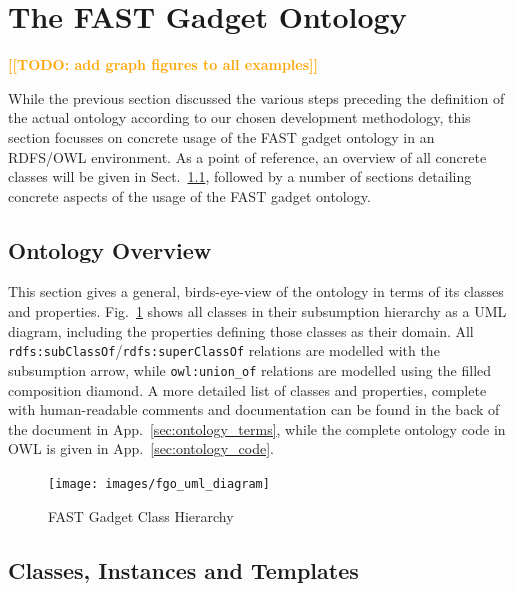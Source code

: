 \documentclass[twoside]{fast_latex}
\newcommand{\todo}[1]{\textsf{\textbf{\textcolor{Orange}{[[TODO: #1]]}}}}
\newcommand{\todo}[1]{}
\begin{document}
%
%
%
\section{The FAST Gadget Ontology} %
\label{sec:ontology}

\todo{add graph figures to all examples}

While the previous section discussed the various steps preceding the definition of the actual ontology according to our chosen development methodology, this section focusses on concrete usage of the FAST gadget ontology in an RDFS/OWL environment. As a point of reference, an overview of all concrete classes will be given in Sect.~\ref{sub:ontology_overview}, followed by a number of sections detailing concrete aspects of the usage of the FAST gadget ontology.

\subsection{Ontology Overview} %
\label{sub:ontology_overview}

This section gives a general, birds-eye-view of the ontology in terms of its classes and properties. Fig.~\ref{fig:ontology_uml} shows all classes in their subsumption hierarchy as a UML diagram, including the properties defining those classes as their domain. All \texttt{rdfs:subClassOf}/\texttt{rdfs:superClassOf} relations are modelled with the subsumption arrow, while \texttt{owl:union\_of} relations are modelled using the filled composition diamond.
A more detailed list of classes and properties, complete with human-readable comments and documentation can be found in the back of the document in App.~\ref{sec:ontology_terms}, while the complete ontology code in OWL is given in App.~\ref{sec:ontology_code}.

\begin{figure}
  \begin{center}
    \texttt{[image: images/fgo\_uml\_diagram]}
    \caption{FAST Gadget Class Hierarchy}
    \label{fig:ontology_uml}
  \end{center}
\end{figure}



\subsection{Classes, Instances and Templates} %
\label{sub:classes_instances_and_templates}
\end{document}
